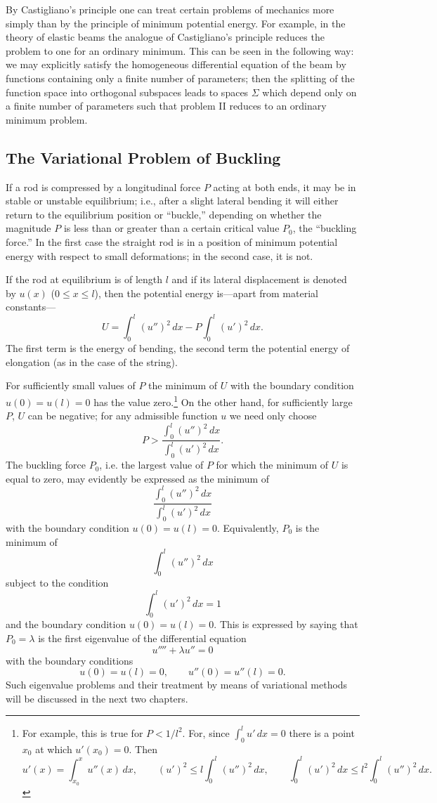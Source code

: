 By Castigliano's principle one can treat certain problems of mechanics more simply than by the principle of minimum potential energy. For example, in the theory of elastic beams the analogue of Castigliano's principle reduces the problem to one for an ordinary minimum. This can be seen in the following way: we may explicitly satisfy the homogeneous differential equation of the beam by functions containing only a finite number of parameters; then the splitting of the function space into orthogonal subspaces leads to spaces $\Sigma$ which depend only on a finite number of parameters such that problem II reduces to an ordinary minimum problem.

\subsection{The Variational Problem of Buckling}
If a rod is compressed by a longitudinal force $P$ acting at both ends, it may be in stable or unstable equilibrium; i.e., after a slight lateral bending it will either return to the equilibrium position or ``buckle,'' depending on whether the magnitude $P$ is less than or greater than a certain critical value $P_0$, the ``buckling force.'' In the first case the straight rod is in a position of minimum potential energy with respect to small deformations; in the second case, it is not.

If the rod at equilibrium is of length $l$ and if its lateral displacement is denoted by $u(x)$ ($0\le x\le l$), then the potential energy is---apart from material constants---
\[
U=\int_0^l(u'')^2\,dx-P\int_0^l(u')^2\,dx.
\]
The first term is the energy of bending, the second term the potential energy of elongation (as in the case of the string).

For sufficiently small values of $P$ the minimum of $U$ with the boundary condition $u(0)=u(l)=0$ has the value zero.\footnote{For example, this is true for $P<1/l^2$. For, since $\int_0^lu'\,dx=0$ there is a point $x_0$ at which $u'(x_0)=0$. Then
\[
u'(x)=\int_{x_0}^x u''(x)\,dx,\qquad (u')^2\le l\int_0^l(u'')^2\,dx,\qquad \int_0^l(u')^2\,dx\le l^2\int_0^l(u'')^2\,dx.
\]}
On the other hand, for sufficiently large $P$, $U$ can be negative; for any admissible function $u$ we need only choose
\[
P>\frac{\int_0^l(u'')^2\,dx}{\int_0^l(u')^2\,dx}.
\]
The buckling force $P_0$, i.e. the largest value of $P$ for which the minimum of $U$ is equal to zero, may evidently be expressed as the minimum of
\[
\frac{\int_0^l(u'')^2\,dx}{\int_0^l(u')^2\,dx}
\]
with the boundary condition $u(0)=u(l)=0$. Equivalently, $P_0$ is the minimum of
\[
\int_0^l(u'')^2\,dx
\]
subject to the condition
\[
\int_0^l(u')^2\,dx=1
\]
and the boundary condition $u(0)=u(l)=0$. This is expressed by saying that $P_0=\lambda$ is the first eigenvalue of the differential equation
\[
u''''+\lambda u''=0
\]
with the boundary conditions
\[
u(0)=u(l)=0,\qquad u''(0)=u''(l)=0.
\]
Such eigenvalue problems and their treatment by means of variational methods will be discussed in the next two chapters.

